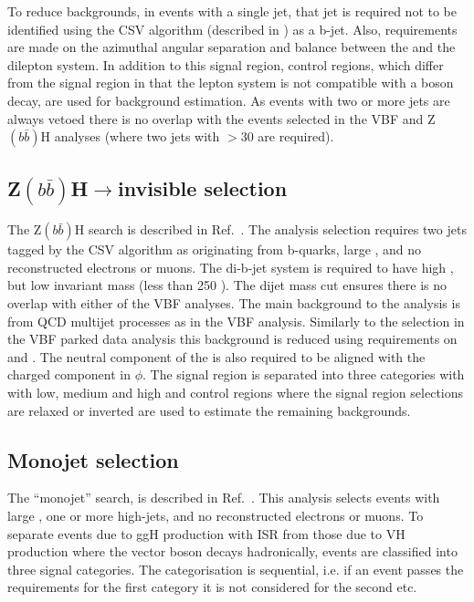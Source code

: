 To reduce backgrounds, in events with a single jet, that jet is required not to be identified using the \ac{CSV} algorithm (described in ) as a b-jet. Also, requirements are made on the azimuthal angular separation and \pt balance between the \MET and the dilepton system. In addition to this signal region, control regions, which differ from the signal region in that the lepton system is not compatible with a \PZ boson decay, are used for background estimation. As events with two or more jets are always vetoed there is no overlap with the events selected in the \ac{VBF} and Z$(b\bar{b})$H analyses (where two jets with \pt$>30$ \GeV are required). 

\subsection{Z$(b\bar{b})$H$\rightarrow$invisible selection}
\label{sec:zbbh}
The Z$(b\bar{b})$H search is described in Ref.~\cite{CMS-PAS-HIG-13-028}. The analysis selection requires two jets tagged by the \ac{CSV} algorithm as originating from b-quarks, large \MET, and no reconstructed electrons or muons. The di-b-jet system is required to have high \pt, but low invariant mass (less than 250 \GeV). The dijet mass cut ensures there is no overlap with either of the \ac{VBF} analyses. The main background to the analysis is from \ac{QCD} multijet processes as in the \ac{VBF} analysis. Similarly to the selection in the \ac{VBF} parked data analysis this background is reduced using requirements on \jetmetdphi and \METsig. The neutral component of the \MET is also required to be aligned with the charged component in $\phi$. The signal region is separated into three categories with with low, medium and high \MET and control regions where the signal region selections are relaxed or inverted are used to estimate the remaining backgrounds.

\subsection{Monojet selection}
\label{sec:monojet}
The ``monojet'' search, is described in Ref.~\cite{CMS-PAS-EXO-12-055}. This analysis selects events with large \MET, one or more high-\pt jets, and no reconstructed electrons or muons. To separate events due to \ac{ggH} production with \ac{ISR} from those due to \ac{VH} production where the vector boson decays hadronically, events are classified into three signal categories. The categorisation is sequential, i.e. if an event passes the requirements for the first category it is not considered for the second etc. 

